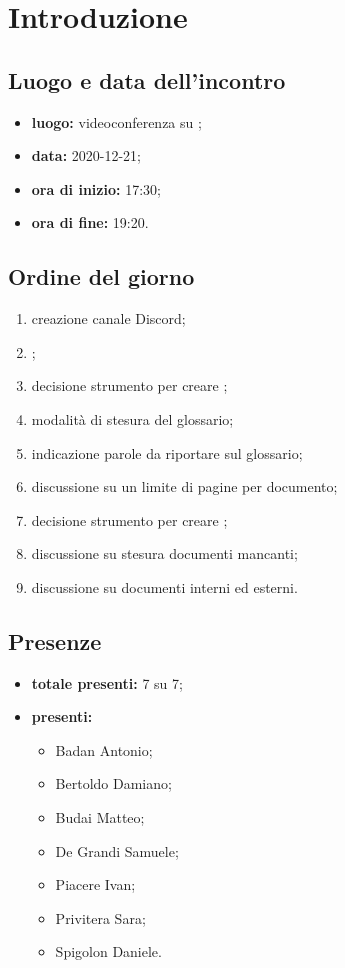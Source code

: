 \section*{Introduzione}

\subsection*{Luogo e data dell'incontro}
\begin{itemize}
	\item \textbf{luogo:} videoconferenza su ;
	\item \textbf{data:} 2020-12-21;
	\item \textbf{ora di inizio:} 17:30;
	\item \textbf{ora di fine:} 19:20.
\end{itemize}

\subsection*{Ordine del giorno}
	\begin{enumerate}
	\item creazione canale Discord;
	\item {};
	\item decisione strumento per creare ;
	\item modalità di stesura del glossario;
	\item indicazione parole da riportare sul glossario;
	\item discussione su un limite di pagine per documento;
	\item decisione strumento per creare ;
	\item discussione su stesura documenti mancanti;
	\item discussione su documenti interni ed esterni.
\end{enumerate}

\subsection*{Presenze}
\begin{itemize}
	\item \textbf{totale presenti:} 7 su 7;
	\item \textbf{presenti: }
	\begin{itemize}
		\item Badan Antonio;
		\item Bertoldo Damiano;
		\item Budai Matteo;
		\item De Grandi Samuele;
		\item Piacere Ivan;
		\item Privitera Sara;
		\item Spigolon Daniele.
	\end{itemize}
\end{itemize}

